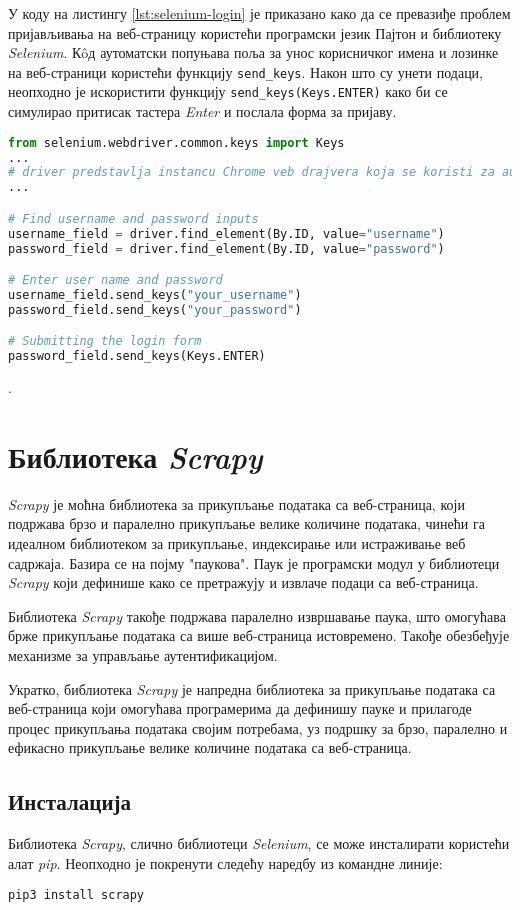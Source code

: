 \documentclass[12pt,oneside]{memoir}
\begin{document}
У коду на листингу \ref{lst:selenium-login} је приказано како да се превазиђе проблем пријављивања на веб-страницу користећи програмски језик Пајтон и библиотеку \textit{Selenium}. Кôд аутоматски попуњава поља за унос корисничког имена и лозинке на веб-страници користећи функцију \texttt{send\_keys}. Након што су унети подаци, неопходно је искористити функцију \texttt{send\_keys(Keys.ENTER)} како би се симулирао притисак тастера \textit{Enter} и послала форма за пријаву.

\begin{lstlisting}[language=Python, caption={Пријављивање на веб-страници}, label={lst:selenium-login}]
from selenium.webdriver.common.keys import Keys
...
# driver predstavlja instancu Chrome veb drajvera koja se koristi za automatizaciju pregledaca
...

# Find username and password inputs
username_field = driver.find_element(By.ID, value="username")
password_field = driver.find_element(By.ID, value="password")

# Enter user name and password
username_field.send_keys("your_username")
password_field.send_keys("your_password")

# Submitting the login form
password_field.send_keys(Keys.ENTER)
\end{lstlisting}.

\section{Библиотека \textit{Scrapy}}
\textit{Scrapy} је моћна библиотека за прикупљање података са веб-страница, који подржава брзо и паралелно прикупљање велике количине података, чинећи га идеалном библиотеком за прикупљање, индексирање или истраживање веб садржаја. Базира се на појму "паукова". Паук је програмски модул у библиотеци \textit{Scrapy} који дефинише како се претражују и извлаче подаци са веб-страница.

Библиотека \textit{Scrapy} такође подржава паралелно извршавање паука, што омогућава брже прикупљање података са више веб-страница истовремено. Такође обезбеђује механизме за управљање аутентификацијом.

Укратко, библиотека \textit{Scrapy} је напредна библиотека за прикупљање података са веб-страница који омогућава програмерима да дефинишу пауке и прилагоде процес прикупљања података својим потребама, уз подршку за брзо, паралелно и ефикасно прикупљање велике количине података са веб-страница.

\subsection{Инсталација}
Библиотека \textit{Scrapy}, слично библиотеци \textit{Selenium}, се може инсталирати користећи алат \textit{pip}. Неопходно је покренути следећу наредбу из командне линије:
\begin{verbatim}
pip3 install scrapy
\end{verbatim}
\end{document}
